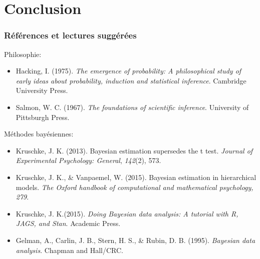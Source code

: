 \documentclass{beamer}
\begin{document}


\section{Conclusion}

\begin{frame}
    \frametitle{Références et lectures suggérées}

    Philosophie:
    \begin{itemize}
      \item Hacking, I. (1975). \emph{The emergence of probability:
            A philosophical study of early ideas about probability,
            induction and statistical inference}. Cambridge University Press.
      \item Salmon, W. C. (1967). \emph{The foundations of scientific inference}.
            University of Pittsburgh Press.
    \end{itemize}

    Méthodes bayésiennes:
    \begin{itemize}
      \item Kruschke, J. K. (2013). Bayesian estimation supersedes the t test.
            \emph{Journal of Experimental Psychology: General}, \emph{142}(2), 573.
      \item Kruschke, J. K., \& Vanpaemel, W. (2015). Bayesian estimation in hierarchical models.
            \emph{The Oxford handbook of computational and mathematical psychology, 279}.
      \item Kruschke, J. K.(2015). \emph{Doing Bayesian data analysis: A tutorial with R, JAGS, and Stan}.
            Academic Press.
      \item Gelman, A., Carlin, J. B., Stern, H. S., \& Rubin, D. B. (1995).
            \emph{Bayesian data analysis}. Chapman and Hall/CRC.
    \end{itemize}
\end{frame}


\end{document}
